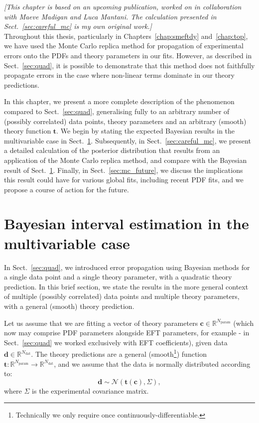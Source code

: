 \documentclass[withindex,glossary]{cam-thesis}
\renewcommand{\vec}[1]{\textbf{#1}} %
\begin{document}
\noindent \textit{[This chapter is based on an upcoming publication, worked on in collaboration with Maeve Madigan and Luca Mantani. The calculation presented in Sect.~\ref{sec:careful_mc} is my own original work.]}\\

\noindent Throughout this thesis, particularly in Chapters~\ref{chap:smeftdy} and~\ref{chap:top}, we have used the Monte Carlo replica method for propagation of experimental errors onto the PDFs and theory parameters in our fits. However, as described in Sect.~\ref{sec:quad}, it is possible to demonstrate that this method does not faithfully propagate errors in the case where non-linear terms dominate in our theory predictions.

In this chapter, we present a more complete description of the phenomenon compared to Sect.~\ref{sec:quad}, generalising fully to an arbitrary number of (possibly correlated) data points, theory parameters and an arbitrary (smooth) theory function $\vec{t}$. We begin by stating the expected Bayesian results in the multivariable case in Sect.~\ref{sec:interval_estimation}. Subsequently, in Sect.~\ref{sec:careful_mc}, we present a detailed calculation of the posterior distribution that results from an application of the Monte Carlo replica method, and compare with the Bayesian result of Sect.~\ref{sec:interval_estimation}. Finally, in Sect.~\ref{sec:mc_future}, we discuss the implications this result could have for various global fits, including recent PDF fits, and we propose a course of action for the future.


\section{Bayesian interval estimation in the multivariable case}
\label{sec:interval_estimation}

In Sect.~\ref{sec:quad}, we introduced error propagation using Bayesian methods for a single data point and a single theory parameter, with a quadratic theory prediction. In this brief section, we state the results in the more general context of multiple (possibly correlated) data points and multiple theory parameters, with a general (smooth) theory prediction.

Let us assume that we are fitting a vector of theory parameters $\vec{c} \in \mathbb{R}^{N_{\text{param}}}$ (which now may comprise PDF parameters alongside EFT parameters, for example - in Sect.~\ref{sec:quad} we worked exclusively with EFT coefficients), given data $\vec{d} \in \mathbb{R}^{N_{\text{dat}}}$. The theory predictions are a general (smooth\footnote{Technically we only require once continuously-differentiable.}) function $\vec{t} : \mathbb{R}^{N_{\text{param}}} \rightarrow \mathbb{R}^{N_{\text{dat}}}$, and we assume that the data is normally distributed according to:
\begin{equation}
\vec{d} \sim \mathcal{N}(\vec{t}(\vec{c}), \Sigma),
\end{equation}
where $\Sigma$ is the experimental covariance matrix.
\end{document}
